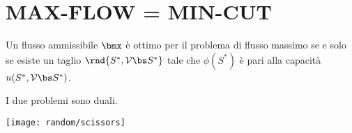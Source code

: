 \documentclass[\main/main.tex]{subfiles}
\begin{document}
\section{MAX-FLOW = MIN-CUT}

\begin{minipage}{\textwidth}
  \begin{minipage}{.83\textwidth}
    \flushleft
    \begin{theorem}[Max-flow = Min-cut]
      Un flusso ammissibile $\bmx$ è ottimo per il problema di flusso massimo se e solo se esiste un taglio $\rnd{S^*, \mathcal{V} \bs S^*}$ tale che $\phi(S^*)$ è pari alla capacità $u(S^*, \mathcal{V} \bs S^*)$.

      I due problemi sono duali.
    \end{theorem}
  \end{minipage}\hfill
  \begin{minipage}{0.15\textwidth}\center
    \texttt{[image: random/scissors]}
  \end{minipage}
\end{minipage}
\end{document}
